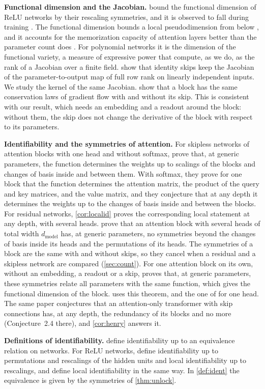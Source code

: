 \documentclass[10pt]{article}
\theoremstyle{definition}
\theoremstyle{remark}
\newcommand{\dm}{d_{\mathrm{model}}}
\newcommand{\para}[1]{\smallskip\noindent\textbf{#1}\hspace{0.5em}}
\begin{document}
\para{Functional dimension and the Jacobian.} \citet{grigsby2022functional} bound the functional dimension of ReLU networks by their rescaling symmetries, and it is observed to fall during training \citep{bonapellissier2024geometry}. The functional dimension bounds a local pseudodimension from below \citep{grigsby2024persistent}, and it accounts for the memorization capacity of attention layers better than the parameter count does \citep{henry2026generic}. For polynomial networks it is the dimension of the functional variety, a measure of expressive power that \citet{kileel2019expressive} compute, as we do, as the rank of a Jacobian over a finite field. \citet{macdonald2023skip} show that identity skips keep the Jacobian of the parameter-to-output map of full row rank on linearly independent inputs. We study the kernel of the same Jacobian. \citet{marcotte2025resnets} show that a block has the same conservation laws of gradient flow with and without its skip. This is consistent with our result, which needs an embedding and a readout around the block: without them, the skip does not change the derivative of the block with respect to its parameters.

\para{Identifiability and the symmetries of attention.} For skipless networks of attention blocks with one head and without softmax, \citet{henry2025lightning} prove that, at generic parameters, the function determines the weights up to scalings of the blocks and changes of basis inside and between them. With softmax, they prove for one block that the function determines the attention matrix, the product of the query and key matrices, and the value matrix, and they conjecture that at any depth it determines the weights up to the changes of basis inside and between the blocks. For residual networks, \cref{cor:localid} proves the corresponding local statement at any depth, with several heads. \citet{wang2025gauge} prove that an attention block with several heads of total width $\dm$ has, at generic parameters, no symmetries beyond the changes of basis inside its heads and the permutations of its heads. The symmetries of a block are the same with and without skips, so they cancel when a residual and a skipless network are compared (\cref{sec:count}). For one attention block on its own, without an embedding, a readout or a skip, \citet[Theorem~2.1]{henry2026generic} proves that, at generic parameters, these symmetries relate all parameters with the same function, which gives the functional dimension of the block.  uses this theorem, and the one of \citet{henry2025lightning} for one head. The same paper conjectures that an attention-only transformer with skip connections has, at any depth, the redundancy of its blocks and no more (Conjecture~2.4 there), and \cref{cor:henry} answers it.

\para{Definitions of identifiability.} \citet{vlacic2020affine} define identifiability up to an equivalence relation on networks. For ReLU networks, \citet{stock2021embedding} define identifiability up to permutations and rescalings of the hidden units and local identifiability up to rescalings, and \citet{bonapellissier2022local} define local identifiability in the same way. In \cref{def:ident} the equivalence is given by the symmetries of \cref{thm:unlock}.
\end{document}
